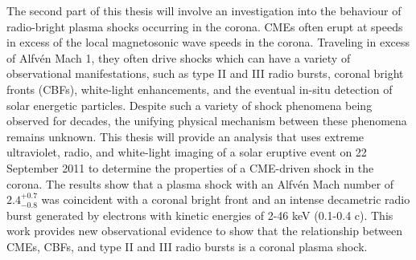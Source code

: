 \begin{abstracts}
The second part of this thesis will involve an investigation into the behaviour of radio-bright plasma shocks occurring in the corona. CMEs often erupt at speeds in excess of the local magnetosonic wave speeds in the corona. Traveling in excess of Alfv\'{e}n Mach 1, they often drive shocks which can have a variety of observational manifestations, such as type II and III radio bursts, coronal bright fronts (CBFs), white-light enhancements, and the eventual in-situ detection of solar energetic particles. Despite such a variety of shock phenomena being observed for decades, the unifying physical mechanism between these phenomena remains unknown. This thesis will provide an analysis that uses extreme ultraviolet, radio, and white-light imaging of a solar eruptive event on 22 September 2011 to determine the properties of a CME-driven shock in the corona. The results show that a plasma shock with an Alfv\'{e}n Mach number of $2.4^{+0.7}_{-0.8}$ was coincident with a coronal bright front and an intense decametric radio burst generated by electrons with kinetic energies of 2-46 keV (0.1-0.4 c). This work provides new observational evidence to show that the relationship between CMEs, CBFs, and type II and III radio bursts is a coronal plasma shock. 



\end{abstracts}

